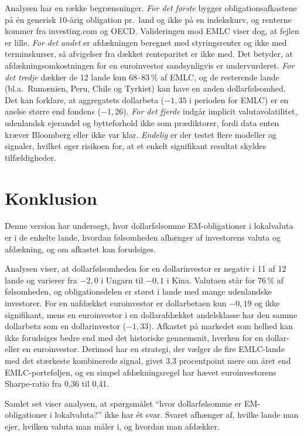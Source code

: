 \documentclass[11pt,a4paper]{article}
\begin{document}
Analysen har en række begrænsninger. \emph{For det første} bygger obligationsafkastene på én generisk 10-årig obligation pr.\ land og ikke på en indekskurv, og renterne kommer fra investing.com og OECD. Valideringen mod EMLC viser dog, at fejlen er lille. \emph{For det andet} er afdækningen beregnet med styringsrenter og ikke med terminskurser, så afvigelser fra dækket renteparitet \citep{du2018} er ikke med. Det betyder, at afdækningsomkostningen for en euroinvestor sandsynligvis er undervurderet. \emph{For det tredje} dækker de 12 lande kun 68--83\,\% af EMLC, og de resterende lande (bl.a.\ Rumænien, Peru, Chile og Tyrkiet) kan have en anden dollarfølsomhed. Det kan forklare, at aggregatets dollarbeta ($-1{,}35$ i perioden for EMLC) er en anelse større end fondens ($-1{,}26$). \emph{For det fjerde} indgår implicit valutavolatilitet, udenlandsk ejerandel og bytteforhold ikke som prædiktorer, fordi data enten kræver Bloomberg eller ikke var klar. \emph{Endelig} er der testet flere modeller og signaler, hvilket øger risikoen for, at et enkelt signifikant resultat skyldes tilfældigheder.

\section{Konklusion}

Denne version har undersøgt, hvor dollarfølsomme EM-obligationer i lokalvaluta er i de enkelte lande, hvordan følsomheden afhænger af investorens valuta og afdækning, og om afkastet kan forudsiges.

Analysen viser, at dollarfølsomheden for en dollarinvestor er negativ i 11 af 12 lande og varierer fra $-2{,}0$ i Ungarn til $-0{,}1$ i Kina. Valutaen står for 76\,\% af følsomheden, og obligationsdelen er størst i lande med mange udenlandske investorer. For en uafdækket euroinvestor er dollarbetaen kun $-0{,}19$ og ikke signifikant, mens en euroinvestor i en dollarafdækket andelsklasse har den samme dollarbeta som en dollarinvestor ($-1{,}33$). Afkastet på markedet som helhed kan ikke forudsiges bedre end med det historiske gennemsnit, hverken for en dollar- eller en euroinvestor. Derimod har en strategi, der vælger de fire EMLC-lande med det stærkeste kombinerede signal, givet 3,3 procentpoint mere om året end EMLC-porteføljen, og en simpel afdækningsregel har hævet euroinvestorens Sharpe-ratio fra 0,36 til 0,41.

Samlet set viser analysen, at spørgsmålet ``hvor dollarfølsomme er EM-obligationer i lokalvaluta?'' ikke har ét svar. Svaret afhænger af, hvilke lande man ejer, hvilken valuta man måler i, og hvordan man afdækker.
\end{document}

